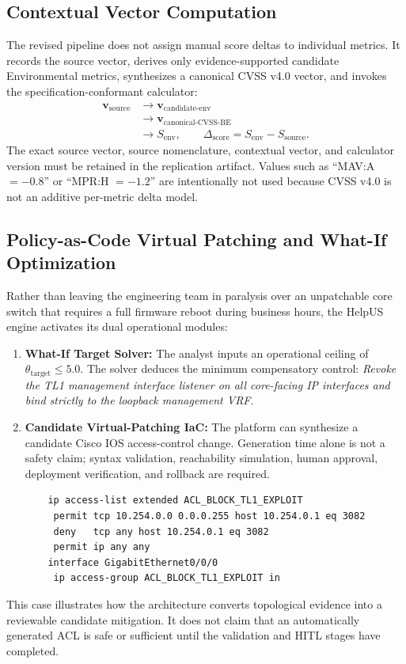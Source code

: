 \subsection{Contextual Vector Computation}
The revised pipeline does not assign manual score deltas to individual metrics. It records the source vector, derives only evidence-supported candidate Environmental metrics, synthesizes a canonical CVSS v4.0 vector, and invokes the specification-conformant calculator:
\begin{align}
    \mathbf{v}_{\text{source}} &\longrightarrow \mathbf{v}_{\text{candidate-env}} \\
    &\longrightarrow \mathbf{v}_{\text{canonical-CVSS-BE}} \\
    &\longrightarrow S_{\text{env}}, \qquad \Delta_{\text{score}} = S_{\text{env}}-S_{\text{source}}.
\end{align}
The exact source vector, source nomenclature, contextual vector, and calculator version must be retained in the replication artifact. Values such as ``MAV:A $=-0.8$'' or ``MPR:H $=-1.2$'' are intentionally not used because CVSS v4.0 is not an additive per-metric delta model.

\subsection{Policy-as-Code Virtual Patching and What-If Optimization}
Rather than leaving the engineering team in paralysis over an unpatchable core switch that requires a full firmware reboot during business hours, the HelpUS engine activates its dual operational modules:
\begin{enumerate}
    \item \textbf{What-If Target Solver:} The analyst inputs an operational ceiling of $\theta_{\text{target}} \le 5.0$. The solver deduces the minimum compensatory control: \textit{Revoke the TL1 management interface listener on all core-facing IP interfaces and bind strictly to the loopback management VRF}.
    \item \textbf{Candidate Virtual-Patching IaC:} The platform can synthesize a candidate Cisco IOS access-control change. Generation time alone is not a safety claim; syntax validation, reachability simulation, human approval, deployment verification, and rollback are required.
    \begin{verbatim}
    ip access-list extended ACL_BLOCK_TL1_EXPLOIT
     permit tcp 10.254.0.0 0.0.0.255 host 10.254.0.1 eq 3082
     deny   tcp any host 10.254.0.1 eq 3082
     permit ip any any
    interface GigabitEthernet0/0/0
     ip access-group ACL_BLOCK_TL1_EXPLOIT in
    \end{verbatim}
\end{enumerate}
This case illustrates how the architecture converts topological evidence into a reviewable candidate mitigation. It does not claim that an automatically generated ACL is safe or sufficient until the validation and HITL stages have completed.

